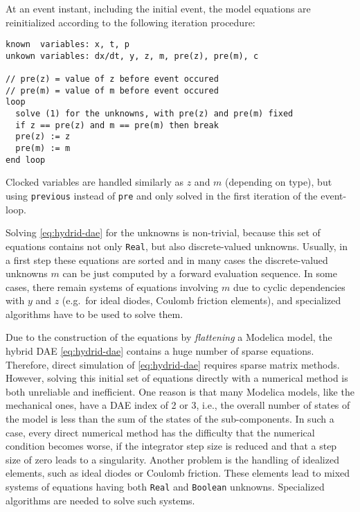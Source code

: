 At an event instant, including the initial event, the model equations
are reinitialized according to the following iteration procedure:
\begin{lstlisting}[language=modelica]
known  variables: x, t, p
unkown variables: dx/dt, y, z, m, pre(z), pre(m), c

// pre(z) = value of z before event occured
// pre(m) = value of m before event occured
loop
  solve (1) for the unknowns, with pre(z) and pre(m) fixed
  if z == pre(z) and m == pre(m) then break
  pre(z) := z
  pre(m) := m
end loop
\end{lstlisting}

Clocked variables are handled similarly as $z$ and $m$ (depending on type), but using \lstinline!previous! instead of \lstinline!pre! and only solved in the first iteration of the event-loop.

Solving \eqref{eq:hydrid-dae} for the unknowns is non-trivial, because this set of equations contains not only \lstinline!Real!, but also discrete-valued unknowns.
Usually, in a first step these equations are sorted and in many cases the discrete-valued unknowns $m$ can be just computed by a forward evaluation sequence.
In some cases, there remain systems of equations involving $m$ due to cyclic dependencies with $y$ and $z$ (e.g.\ for ideal diodes, Coulomb friction elements), and specialized algorithms have to be used to solve them.

Due to the construction of the equations by \emph{flattening} a Modelica model, the hybrid DAE \eqref{eq:hydrid-dae} contains a huge number of sparse equations.
Therefore, direct simulation of \eqref{eq:hydrid-dae} requires sparse matrix methods.
However, solving this initial set of equations directly with a numerical method is both unreliable and inefficient.
One reason is that many Modelica models, like the mechanical ones, have a DAE index of 2 or 3, i.e., the overall number of states of the model is less than the sum of the states of the sub-components.
In such a case, every direct numerical method has the difficulty that the numerical condition becomes worse, if the integrator step size is reduced and that a step size of zero leads to a singularity.
Another problem is the handling of idealized elements, such as ideal diodes or Coulomb friction.
These elements lead to mixed systems of equations having both \lstinline!Real! and \lstinline!Boolean! unknowns.
Specialized algorithms are needed to solve such systems.

